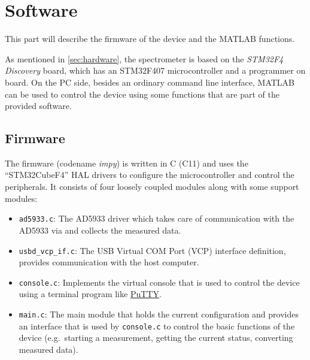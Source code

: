 \chapter{Software} \label{sec:software}

This part will describe the firmware of the device and the MATLAB functions.

As mentioned in \autoref{sec:hardware}, the spectrometer is based on the \emph{STM32F4 Discovery} board, which has
an STM32F407 microcontroller and a programmer on board. On the PC side, besides an ordinary command line interface,
MATLAB can be used to control the device using some functions that are part of the provided software.


\section{Firmware}

The firmware (codename \emph{impy}) is written in C (C11) and uses the \enquote{STM32CubeF4} HAL\footnotemark{} drivers
to configure the microcontroller and control the peripherals.
It consists of four loosely coupled modules along with some support modules:
%
\begin{itemize}
	\item \verb!ad5933.c!: The AD5933 driver which takes care of communication with the AD5933 via \iic{} and collects
        the measured data.
  
  \item \verb!usbd_vcp_if.c!: The USB Virtual COM Port (VCP) interface definition, provides communication with the
        host computer.
  
  \item \verb!console.c!: Implements the virtual console that is used to control the device using a terminal
        program like \href{http://www.chiark.greenend.org.uk/~sgtatham/putty/}{PuTTY}.
  
  \item \verb!main.c!: The main module that holds the current configuration and provides an interface that is used
        by \verb!console.c! to control the basic functions of the device (e.g.\ starting a measurement, getting the
        current status, converting measured data).
\end{itemize}

